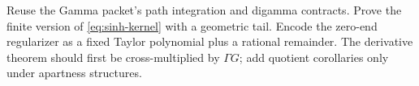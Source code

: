 \begin{roadmap}
Reuse the Gamma packet's path integration and digamma contracts.  Prove the
finite version of \cref{eq:sinh-kernel} with a geometric tail.  Encode the
zero-end regularizer as a fixed Taylor polynomial plus a rational remainder.
The derivative theorem should first be cross-multiplied by \(\Gamma G\); add
quotient corollaries only under apartness structures.
\end{roadmap}
